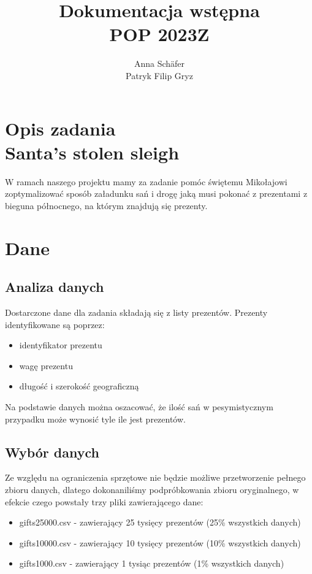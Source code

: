 \documentclass[titlepage]{article}
\title{
    {
        \huge Dokumentacja wstępna
    } \\
    POP 2023Z
}
\author {
    Anna Schäfer  \\
    Patryk Filip Gryz
}
\begin{document}
    \maketitle

    \newpage

    \tableofcontents

    \newpage

    \section{
        Opis zadania \\
        \large Santa’s stolen sleigh
    }
    W ramach naszego projektu mamy za zadanie pomóc świętemu Mikołajowi zoptymalizować sposób załadunku sań i 
    drogę jaką musi pokonać z prezentami z bieguna północnego, na którym znajdują się prezenty.

    \section{
        Dane
    }
        \subsection{
            Analiza danych
        }
            Dostarczone dane dla zadania składają się z listy prezentów. Prezenty identyfikowane są poprzez:
            \begin{itemize}
                \item identyfikator prezentu
                \item wagę prezentu
                \item długość i szerokość geograficzną
            \end{itemize}    

            Na podstawie danych można oszacować, że ilość sań w pesymistycznym przypadku może wynosić tyle ile jest prezentów.

        \subsection{
            Wybór danych
        }
            Ze względu na ograniczenia sprzętowe nie będzie możliwe przetworzenie pełnego zbioru danych, 
            dlatego dokonaniliśmy podpróbkowania zbioru oryginalnego, w efekcie czego powstały trzy pliki zawierającego dane:
            \begin{itemize}
                \item gifts25000.csv - zawierający 25 tysięcy prezentów (25\% wszystkich danych)
                \item gifts10000.csv - zawierający 10 tysięcy prezentów (10\% wszystkich danych)
                \item gifts1000.csv - zawierający 1 tysiąc prezentów (1\% wszystkich danych)
            \end{itemize} 
\end{document}
